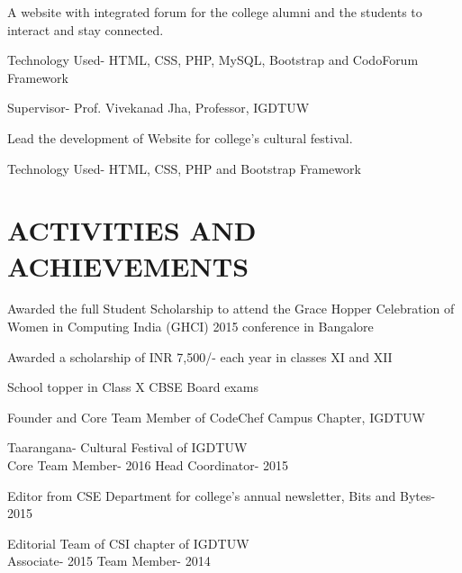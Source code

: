 \documentclass[]{deedy-resume-openfont}
\begin{document}
\begin{minipage}[t]{0.66\textwidth}
A website with integrated forum for the college alumni and the students to interact and stay connected.
\begin{tightemize}
\item Technology Used- HTML, CSS, PHP, MySQL, Bootstrap and CodoForum Framework
\item Supervisor- Prof. Vivekanad Jha, Professor, IGDTUW
\end{tightemize}
\sectionsep

Lead the development of Website for college’s cultural festival. 
\begin{tightemize}
\item Technology Used- HTML, CSS, PHP and Bootstrap Framework
\end{tightemize}

\sectionsep


\section{ACTIVITIES AND ACHIEVEMENTS}

\begin{tightemize}
\item Awarded the full Student Scholarship to attend the Grace Hopper Celebration of Women in Computing India (GHCI) 2015 conference in Bangalore
\item Awarded a scholarship of INR 7,500/-  each year in classes XI and XII
\item School topper in Class X CBSE Board exams
\end{tightemize}
\sectionsep

\begin{tightemize}
\item Founder and Core Team Member of CodeChef Campus Chapter, IGDTUW
\item Taarangana- Cultural Festival of IGDTUW \\
\textbullet{} Core Team Member- 2016 \textbullet{} Head Coordinator- 2015
\item Editor from CSE Department for college’s annual newsletter, Bits and Bytes- 2015
\item Editorial Team of CSI chapter of IGDTUW \\
\textbullet{} Associate- 2015 \textbullet{} Team Member- 2014
\end{tightemize}
\sectionsep


\end{minipage}
\end{document}
